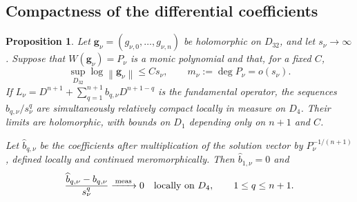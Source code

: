 \documentclass[11pt,letterpaper,reqno]{amsart}
\newtheorem{prop}[thm]{Proposition}
\theoremstyle{remark}
\numberwithin{equation}{section}
\newcommand{\norm}[1]{\left\lVert#1\right\rVert}
\newcommand{\convmeas}{\xrightarrow{\,\mathrm{meas}\,}}
\newcommand{\gv}{\bm g}
\begin{document}
\subsection{Compactness of the differential coefficients}

\begin{prop}\label{prop:localcompact}
Let $\gv_\nu=(g_{\nu,0},\ldots,g_{\nu,n})$ be holomorphic on $D_{32}$,
and let $s_\nu\to\infty$. Suppose that $W(\gv_\nu)=P_\nu$ is a monic
polynomial and that, for a fixed $C$,
\begin{equation}\label{eq:localhyp}
 \sup_{D_{32}}\log\norm{\gv_\nu}\le Cs_\nu,
 \qquad m_\nu:=\deg P_\nu=o(s_\nu).
\end{equation}
If $L_\nu=D^{n+1}+\sum_{q=1}^{n+1} b_{q,\nu}D^{n+1-q}$ is the fundamental operator,
the sequences $b_{q,\nu}/s_\nu^q$ are simultaneously relatively compact
locally in measure on $D_4$. Their limits are holomorphic, with bounds on
$D_1$ depending only on $n+1$ and $C$.

Let $\widehat b_{q,\nu}$ be the coefficients after multiplication of the
solution vector by $P_\nu^{-1/(n+1)}$, defined locally and continued
meromorphically. Then $\widehat b_{1,\nu}=0$ and
\begin{equation}\label{eq:gaugecomparison}
 \frac{\widehat b_{q,\nu}-b_{q,\nu}}{s_\nu^q}\convmeas0
 \quad\hbox{locally on }D_4,\qquad 1\le q\le n+1.
\end{equation}
\end{prop}
\end{document}
